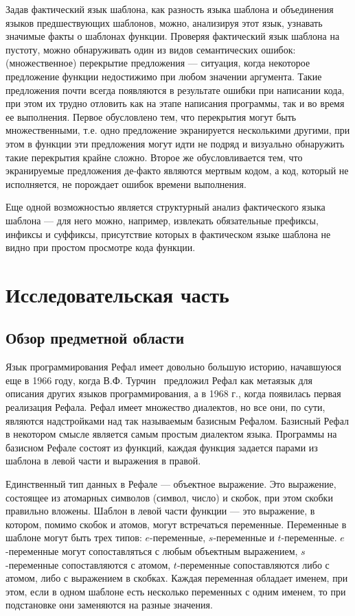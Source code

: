 Задав фактический язык шаблона, как разность языка шаблона и объединения языков 
предшествующих шаблонов, можно, анализируя этот язык, 
узнавать значимые факты о шаблонах функции.
Проверяя фактический язык шаблона на пустоту, можно обнаруживать один из видов семантических ошибок: (множественное) перекрытие предложения ---
ситуация, когда некоторое предложение функции недостижимо при любом значении аргумента.
Такие предложения почти всегда появляются в результате ошибки при написании кода, при
этом их трудно отловить как на этапе написания программы, так
и во время ее выполнения. Первое обусловлено тем, что перекрытия могут быть множественными, 
т.е. одно предложение экранируется несколькими другими, при этом в функции эти 
предложения могут идти не подряд и визуально обнаружить такие перекрытия крайне сложно.
Второе же обусловливается тем, что экранируемые предложения де-факто являются мертвым кодом, 
а код, который не исполняется, не порождает ошибок времени выполнения.

Еще одной возможностью является структурный анализ фактического языка шаблона --- 
для него можно, например, извлекать обязательные префиксы, инфиксы и суффиксы, 
присутствие которых в фактическом языке шаблона не видно  при простом 
просмотре кода функции.

\section{Исследовательская часть}

\subsection{Обзор предметной области} %

Язык программирования Рефал имеет довольно большую историю, начавшуюся 
еще в 1966 году, когда В.Ф. Турчин~\cite{turchin1989refal} предложил
Рефал как метаязык для описания других языков программирования, а 
в 1968 г., когда появилась первая реализация Рефала. Рефал имеет множество диалектов, но все они, по сути, являются надстройками над так называемым базисным Рефалом. Базисный Рефал в некотором смысле является самым простым диалектом языка. Программы на базисном Рефале состоят из функций, каждая функция задается парами из шаблона в левой части и выражения в правой.

Единственный тип данных в Рефале --- объектное выражение. Это выражение, 
состоящее из атомарных символов (символ, число) и скобок, при этом скобки правильно вложены. 
Шаблон в левой части функции --- это выражение, в котором, помимо скобок и атомов, могут встречаться переменные. Переменные в шаблоне могут быть трех типов: $e$-переменные, $s$-переменные и $t$-переменные. $e$-переменные могут сопоставляться с любым объектным выражением, $s$-переменные сопоставляются с атомом, $t$-переменные сопоставляются либо с атомом, либо с выражением в скобках. Каждая переменная обладает именем, при этом, если в одном шаблоне есть несколько переменных с одним именем, то при подстановке они заменяются на разные значения.

